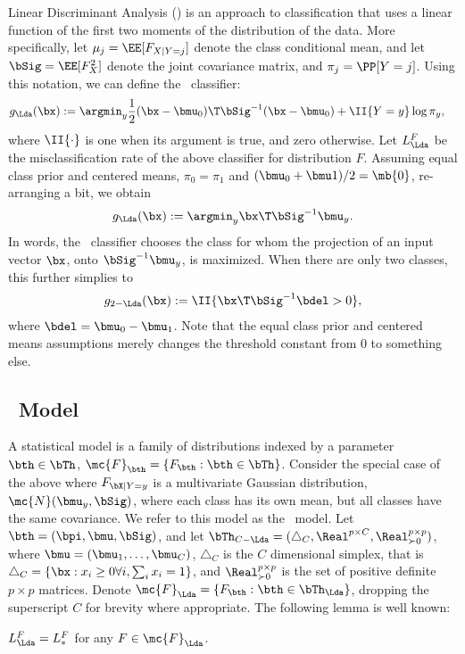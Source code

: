 \documentclass[10pt]{article}
\begin{document}
Linear Discriminant Analysis (\Lda) is an approach to classification that uses a linear function of the first two moments of the distribution of the data.  More specifically, let $\mu_j=\EE[F_{X|Y=j}]$ denote the class conditional mean, and let $\bSig=\EE[F_{X}^2]$ denote the joint covariance matrix, and $\pi_j=\PP[Y=j]$.   Using this notation, we can define the \Lda~classifier:
\begin{align*}
g_{\Lda}(\bx)&:=\argmin_y \frac{1}{2} (\bx-\bmu_0)\T \bSig^{-1}(\bx-\bmu_0) + \II\{Y=y\}  \log \pi_y,
\end{align*}  
where $\II\{ \cdot\}$ is one when its argument is true, and zero otherwise.
Let $L_{\Lda}^F$ be the misclassification rate of the above classifier for distribution $F$.
% 
Assuming equal class prior and centered means,  $\pi_0=\pi_1$ and $(\bmu_0+\bmu1)/2=\mb{0}$, re-arranging a bit, we obtain
\begin{align*}
g_{\Lda}(\bx) :=  \argmin_y \bx\T \bSig^{-1} \bmu_y.
\end{align*}
In words, the  \Lda~classifier chooses the class for whom the projection of an input vector $\bx$, onto $\bSig^{-1} \bmu_y$, is maximized.
% 
When there are only two classes, this further simplies to 
\begin{align*}
g_{2-\Lda}(\bx) :=  \II\{ \bx\T \bSig^{-1} \bdel > 0 \},
\end{align*}
where $\bdel=\bmu_0-\bmu_1$.   Note that the equal class prior and centered means assumptions merely changes the threshold constant from $0$ to something else.  

\subsection{\Lda~Model}

A statistical model is  a family of distributions indexed by a parameter $\bth \in \bTh$, $\mc{F}_{\bth}=\{F_{\bth} : \bth \in \bTh \}$.  
Consider the special case of the above where $F_{\bX|Y=y}$ is a multivariate Gaussian distribution, 
$\mc{N}(\bmu_y,\bSig)$, where each class has its own mean, but all classes have the same covariance. 
We refer to this model as the \Lda~model. 
Let $\bth=(\bpi,\bmu,\bSig)$, and let $\bTh_{C-\Lda}=( \triangle_C, \Real^{p \times C},\Real_{\succ 0}^{p \times p})$, where $\bmu=(\bmu_1,\ldots, \bmu_C)$, $\triangle_C$ is the $C$ dimensional simplex, that is $\triangle_C = \{ \bx : x_i \geq 0 \forall i, \sum_i x_i = 1\}$, and $\Real_{\succ 0}^{p \times p}$ is the set of positive definite  $p \times p$ matrices. Denote
$\mc{F}_{\Lda}=\{F_{\bth} : \bth \in \bTh_{\Lda}\}$, dropping the superscript $C$ for brevity where appropriate.
The following lemma is well known:
\begin{lem}
$L_{\Lda}^F=L_*^F$ for any $F \in \mc{F}_{\Lda}$.
\end{lem}
\end{document}
